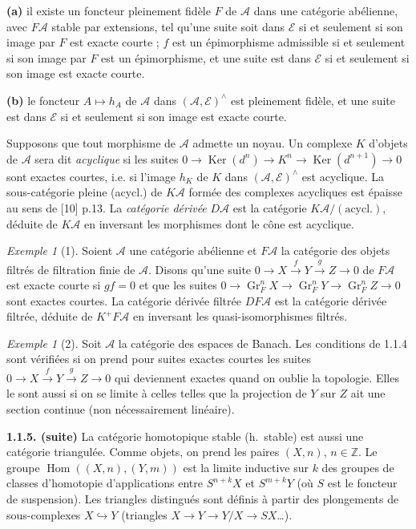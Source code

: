 \documentclass[12pt,a4paper]{article}
\theoremstyle{plain}
\theoremstyle{definition}
\theoremstyle{remark}
\newtheorem{example}[theorem]{Exemple}
\DeclareMathOperator{\Hom}{Hom}
\DeclareMathOperator{\Ker}{Ker}
\DeclareMathOperator{\Gr}{Gr}
\newcommand{\ZZ}{\mathbb{Z}}
\newcommand{\cA}{\mathcal{A}}
\newcommand{\cE}{\mathcal{E}}
\begin{document}
\noindent
\textbf{(a)} il existe un foncteur pleinement fidèle $F$ de $\cA$ dans une catégorie abélienne, avec $F\cA$ stable par extensions, tel qu'une suite soit dans $\cE$ si et seulement si son image par $F$ est exacte courte ; $f$ est un épimorphisme admissible si et seulement si son image par $F$ est un épimorphisme, et une suite est dans $\cE$ si et seulement si son image est exacte courte.

\medskip

\noindent
\textbf{(b)} le foncteur $A \mapsto h_{A}$ de $\cA$ dans $(\cA, \cE)^{\wedge}$ est pleinement fidèle, et une suite est dans $\cE$ si et seulement si son image est exacte courte.

\medskip

Supposons que tout morphisme de $\cA$ admette un noyau. Un complexe $K$ d'objets de $\cA$ sera dit \emph{acyclique} si les suites $0 \to \Ker(d^{n}) \to K^{n} \to \Ker(d^{n+1}) \to 0$ sont exactes courtes, i.e. si l'image $h_{K}$ de $K$ dans $(\cA, \cE)^{\wedge}$ est acyclique. La sous-catégorie pleine (acycl.) de $K\cA$ formée des complexes acycliques est épaisse au sens de [10] p.13. La \emph{catégorie dérivée} $D\cA$ est la catégorie $K\cA/(\text{acycl.})$, déduite de $K\cA$ en inversant les morphismes dont le cône est acyclique.

\begin{example}[1]
Soient $\cA$ une catégorie abélienne et $F\cA$ la catégorie des objets filtrés de filtration finie de $\cA$. Disons qu'une suite $0 \to X \xrightarrow{f} Y \xrightarrow{g} Z \to 0$ de $F\cA$ est exacte courte si $gf = 0$ et que les suites $0 \to \Gr^{n}_{F}X \to \Gr^{n}_{F}Y \to \Gr^{n}_{F}Z \to 0$ sont exactes courtes. La catégorie dérivée filtrée $DF\cA$ est la catégorie dérivée filtrée, déduite de $K^{+}F\cA$ en inversant les quasi-isomorphismes filtrés.
\end{example}

\begin{example}[2]
Soit $\cA$ la catégorie des espaces de Banach. Les conditions de 1.1.4 sont vérifiées si on prend pour suites exactes courtes les suites $0 \to X \xrightarrow{f} Y \xrightarrow{g} Z \to 0$ qui deviennent exactes quand on oublie la topologie. Elles le sont aussi si on se limite à celles telles que la projection de $Y$ sur $Z$ ait une section continue (non nécessairement linéaire).
\end{example}

\medskip

\noindent
\textbf{1.1.5. (suite)} La catégorie homotopique stable (h.~stable) est aussi une catégorie triangulée. Comme objets, on prend les paires $(X, n)$, $n \in \ZZ$. Le groupe $\Hom((X, n), (Y, m))$ est la limite inductive sur $k$ des groupes de classes d'homotopie d'applications entre $S^{n+k}X$ et $S^{m+k}Y$ (où $S$ est le foncteur de suspension). Les triangles distingués sont définis à partir des plongements de sous-complexes $X \hookrightarrow Y$ (triangles $X \to Y \to Y/X \to SX$\ldots).
\end{document}

